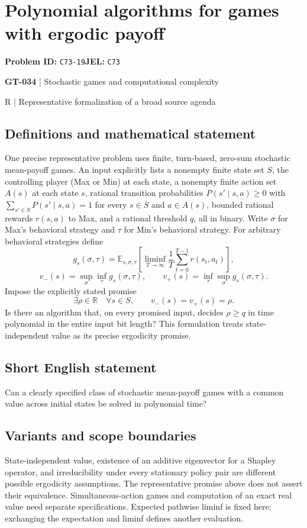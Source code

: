 \documentclass[11pt,a4paper]{article}
\begin{document}
\section*{Polynomial algorithms for games with ergodic payoff}
\textbf{Problem ID:} \texttt{C73-19}\quad \textbf{JEL:} \texttt{C73}\par
\label{problem:OP-0164}
\label{game:GT-034}
{\sffamily\small\color{muted}
{\sffamily\small\color{muted}\textbf{GT-034} | Stochastic games and computational complexity\par R | Representative formalization of a broad source agenda\par}
\par}
\subsection*{Definitions and mathematical statement}
One precise representative problem uses finite, turn-based, zero-sum stochastic mean-payoff games. An input explicitly lists a nonempty finite state set $S$, the controlling player (Max or Min) at each state, a nonempty finite action set $A(s)$ at each state $s$, rational transition probabilities $P(s'\mid s,a)\geq0$ with $\sum_{s'\in S}P(s'\mid s,a)=1$ for every $s\in S$ and $a\in A(s)$, bounded rational rewards $r(s,a)$ to Max, and a rational threshold $q$, all in binary. Write $\sigma$ for Max's behavioral strategy and $\tau$ for Min's behavioral strategy. For arbitrary behavioral strategies define
\[
 g_s(\sigma,\tau)=\mathbb E_{s,\sigma,\tau}
 \left[\liminf_{T\to\infty}\frac1T\sum_{t=0}^{T-1}r(s_t,a_t)\right],
\]
\[
 v_-(s)=\sup_\sigma\inf_\tau g_s(\sigma,\tau),
 \qquad v_+(s)=\inf_\tau\sup_\sigma g_s(\sigma,\tau).
\]
Impose the explicitly stated promise
\[
 \exists\rho\in\mathbb R\quad\forall s\in S,\qquad
 v_-(s)=v_+(s)=\rho.
\]
Is there an algorithm that, on every promised input, decides $\rho\geq q$ in time polynomial in the entire input bit length? This formulation treats state-independent value as its precise ergodicity promise.
\subsection*{Short English statement}
Can a clearly specified class of stochastic mean-payoff games with a common value across initial states be solved in polynomial time?
\subsection*{Variants and scope boundaries}
State-independent value, existence of an additive eigenvector for a Shapley operator, and irreducibility under every stationary policy pair are different possible ergodicity assumptions. The representative promise above does not assert their equivalence. Simultaneous-action games and computation of an exact real value need separate specifications. Expected pathwise liminf is fixed here; exchanging the expectation and liminf defines another evaluation.
\end{document}
